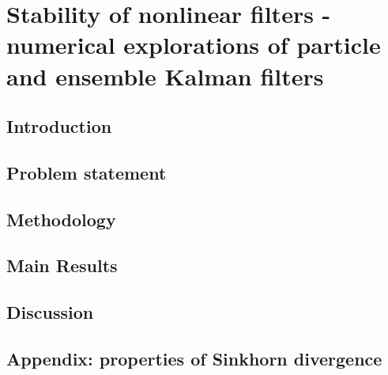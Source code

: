 \chapter{ 
Stability of nonlinear filters - numerical explorations of particle and ensemble Kalman filters
}
\section{Introduction} \label{sec-intro--numerical-fs}


\section{Problem statement} \label{sec-prob--numerical-fs}


\section{Methodology} \label{sec-method--numerical-fs}


\section{Main Results} \label{sec-res--numerical-fs}

\section{Discussion} \label{sec-disc--numerical-fs}



\section{Appendix: properties of Sinkhorn divergence} \label{sec-app--numerical-fs}






